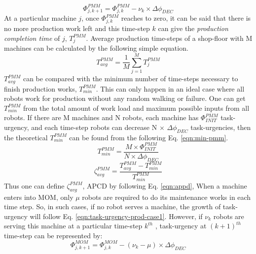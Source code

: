 \begin{equation}
\Phi_{j, k+1}^{PMM} = \Phi_{j, k}^{PMM} - \nu_{k} \times \Delta \phi_{DEC}
\label{eqn:task-urgency-prod-case2}
\end{equation}
At a particular machine $j$, once $\Phi_{j, k}^{PMM}$ reaches to zero, it can be said that there is no more production work left and this time-step $k$ can give the {\em production completion time} of $j$, $T_{j}^{PMM}$. Average production time-steps of a shop-floor with M machines can be calculated by the following simple equation.
\begin{equation}
T_{avg}^{PMM} = \frac{1}{M} \sum_{j=1}^{M} T_{j}^{PMM} 
\label{eqn:avg-pmm}
\end{equation}
$T_{avg}^{PMM}$ can be compared with the minimum number of time-steps necessary to finish production works, $T_{min}^{PMM}$. This can only happen in an ideal case where all robots work for production without any random walking or failure. One can get $T_{min}^{PMM}$ from the total amount of work load and maximum possible inputs from all robots. If there are M machines and N robots, each machine has $\Phi_{INIT}^{PMM}$ task-urgency, and each time-step robots can decrease N $\times$ $\Delta \phi_{DEC}$ task-urgencies, then the theoretical $T_{min}^{PMM}$ can be found from the following Eq. \ref{eqn:min-pmm}.
%
\begin{equation}
T_{min}^{PMM} = \frac{M \times \Phi_{INIT}^{PMM}}{N \times \Delta \phi_{DEC}} 
\label{eqn:min-pmm}
\end{equation}
\begin{equation}
\zeta_{avg}^{PMM} = \frac{T_{avg}^{PMM} - T_{min}^{PMM}}{T_{min}^{PMM}} 
\label{eqn:appd}
\end{equation}
Thus one can define $\zeta_{avg}^{PMM}$, \acf{APCD} by following Eq. \ref{eqn:appd},
When a machine enters into MOM, only $\mu$ robots are required to do its maintenance works in each time step. So, in such cases, if no robot serves a machine, the growth of task-urgency will follow Eq. \ref{eqn:task-urgency-prod-case1}. However, if $\nu_{k}$ robots are serving this machine at a particular time-step $k^{th}$ , task-urgency at $(k+1)^{th}$ time-step can be represented by:
\begin{equation}
\Phi_{j, k+1}^{MOM} = \Phi_{j, k}^{MOM}- (\nu_{k} - \mu) \times \Delta \phi_{DEC}
\label{eqn:task-urgency-maint-case}
\end{equation}
